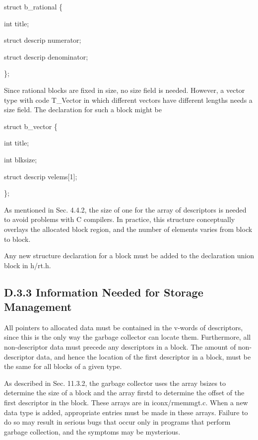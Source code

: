 {\ttfamily\mdseries
struct b\_rational \{}

{\ttfamily\mdseries
int title;}

{\ttfamily\mdseries
struct descrip numerator;}

{\ttfamily\mdseries
struct descrip denominator;}

{\ttfamily\mdseries
\};}


Since rational blocks are fixed in size, no size field is
needed. However, a vector type with code T\_Vector in which different
vectors have different lengths needs a size field. The declaration for
such a block might be

{\ttfamily\mdseries
struct b\_vector \{}

{\ttfamily\mdseries
int title;}

{\ttfamily\mdseries
int blksize;}

{\ttfamily\mdseries
struct descrip velems[1];}

{\ttfamily\mdseries
\};}


As mentioned in Sec. 4.4.2, the size of one for the array of
descriptors is needed to avoid problems with C compilers.  In
practice, this structure conceptually overlays the allocated block
region, and the number of elements varies from block to block.

Any new structure declaration for a block must be added to the
declaration union block in h/rt.h.

\subsection[D.3.3 Information Needed for Storage Management]{D.3.3 Information Needed for Storage Management}

All pointers to allocated data must be contained in the v-words of
descriptors, since this is the only way the garbage collector can
locate them. Furthermore, all non-descriptor data must precede any
descriptors in a block. The amount of non-descriptor data, and hence
the location of the first descriptor in a block, must be the same for
all blocks of a given type.

As described in Sec. 11.3.2, the garbage collector uses the array
bsizes to determine the size of a block and the array firstd to
determine the offset of the first descriptor in the block. These
arrays are in iconx/rmemmgt.c. When a new data type is added,
appropriate entries must be made in these arrays. Failure to do so may
result in serious bugs that occur only in programs that perform
garbage collection, and the symptoms may be mysterious.

